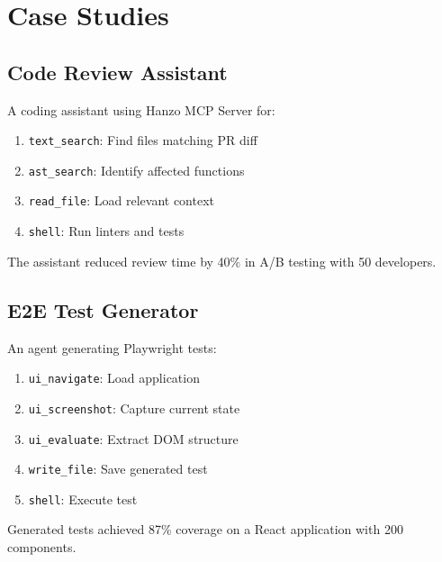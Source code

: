 \section{Case Studies}


\subsection{Code Review Assistant}

A coding assistant using Hanzo MCP Server for:
\begin{enumerate}
    \item \texttt{text\_search}: Find files matching PR diff
    \item \texttt{ast\_search}: Identify affected functions
    \item \texttt{read\_file}: Load relevant context
    \item \texttt{shell}: Run linters and tests
\end{enumerate}

The assistant reduced review time by 40\% in A/B testing with 50 developers.

\subsection{E2E Test Generator}

An agent generating Playwright tests:
\begin{enumerate}
    \item \texttt{ui\_navigate}: Load application
    \item \texttt{ui\_screenshot}: Capture current state
    \item \texttt{ui\_evaluate}: Extract DOM structure
    \item \texttt{write\_file}: Save generated test
    \item \texttt{shell}: Execute test
\end{enumerate}

Generated tests achieved 87\% coverage on a React application with 200 components.

